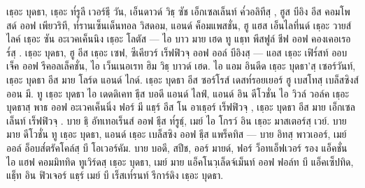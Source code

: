 \begin{leader}
\end{leader}
เธฺอะ บุดธา, เธฺอะ ท๎รูลี เวอร์ธฺี วัน, เอ็นดาวด์ วิธฺ
	ซัช เอ็กเซลเล็นท์ ค๎วอลิทีสฺ ,
ฮูส บีอิง อีส คอมโพสด์ ออฟ เพียวริที, ท๎รานเซ็นเด็นทอล วิสดอม,
	แอนด์ ค็อมแพสชั่น,
ฮู แฮส เอ็นไลทึ่นด์ เธฺอะ วายส์ ไลค์ เธฺอะ ซัน อะเวคเค็นนิง เธฺอะ โลตัส —
ไอ บาว มาย เฮด ทู แธฺท พีสฟูล์ ชีฟ ออฟ คองเคอเรอร๎สฺ .
เธฺอะ บุดธา, ฮู อีส เธฺอะ เซฟ, ซีเคียวร์ เร็ฟฟิวจฺ  ออฟ ออล์ บีอิงสฺ —
แอส เธฺอะ เฟิร๎สท์ ออบเจ็ค ออฟ รีคอลเล็คชั่น, ไอ เว็นเนอเรท ฮิม วิธฺ บาวด์ เฮด.
ไอ แอม อินดีด เธฺอะ บุดธา’สฺ เซอร์วันท์, เธฺอะ บุดธา อีส มาย โลร์ด แอนด์ ไกด์.
เธฺอะ บุดธา อีส ซอร์โรส์ เดสท๎รอยเยอร์ ฮู   เบสโทสฺ  เบล็สซิงส์ ออน มี.
ทู เธฺอะ บุดธา ไอ เดดดิเคท ธฺีส บอดี แอนด์ ไลฟ์,
แอนด์ อิน ดีโวชั่น ไอ วิวล์ วอล์ค เธฺอะ บุดธาสฺ  พาธ ออฟ อะเวคเค็นนิ่ง
ฟอร์ มี แธฺร์ อีส โน อาเธฺอร์ เร็ฟฟิวจฺ , เธฺอะ บุดธา อีส มาย เอ็กเซลเล็นท์ เร็ฟฟิวจฺ .
บาย ธฺิ อัทเทอเร็นส์ ออฟ ธฺีส ท๎รูธฺ์, เมย์ ไอ โกรว์ อิน เธฺอะ มาสเตอร์สฺ  เวย์.
บาย มาย ดีโวชั่น ทู เธฺอะ บุดธา, แอนด์ เธฺอะ เบล็สซิง ออฟ ธฺีส แพร็คทิส —
บาย อิทสฺ  พาวเออร์, เมย์ ออล์ อ็อบส๎ตรัคโคล์สฺ บี โอเวอร์คัม.
บาย บอดี, สปีช, ออร์ มายด์,
ฟอร์ ว็อทเอ็ฟเวอร์ รอง แอ็คชั่น ไอ แฮฟ คอมมิททิด ทูเวิร์ดสฺ  เธฺอะ บุดธา,
เมย์ มาย แอ็คโนวฺเล็ดจ์เม็นท์ ออฟ ฟอล์ท บี แอ็คเซ็ปทิด,
แธฺ็ท อิน ฟิวเจอร์ แธฺร์ เมย์ บี เร็สเท๎รนท์ รีการ์ดิง เธฺอะ บุดธา.

